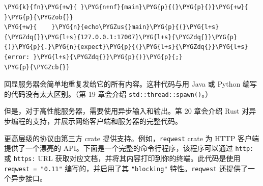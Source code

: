 \begin{Verbatim}[commandchars=\\\{\},breaklines=true,breakanywhere=true,fontsize=\codefont,xleftmargin=17bp]
\PYG{k}{fn}\PYG{+w}{ }\PYG{n+nf}{main}\PYG{p}{(}\PYG{p}{)}\PYG{+w}{ }\PYG{p}{\PYGZob{}}
\PYG{+w}{    }\PYG{n}{echo\PYGZus{}main}\PYG{p}{(}\PYG{l+s}{\PYGZdq{}}\PYG{l+s}{127.0.0.1:17007}\PYG{l+s}{\PYGZdq{}}\PYG{p}{)}\PYG{p}{.}\PYG{n}{expect}\PYG{p}{(}\PYG{l+s}{\PYGZdq{}}\PYG{l+s}{error: }\PYG{l+s}{\PYGZdq{}}\PYG{p}{)}\PYG{p}{;}
\PYG{p}{\PYGZcb{}}
\end{Verbatim}

回显服务器会简单地重复发给它的所有内容。这种代码与用 Java 或 Python 编写的代码没有太大区别。（第 19 章会介绍 \texttt{std::thread::spawn()}。）

但是，对于高性能服务器，需要使用异步输入和输出。第 20 章会介绍 Rust 对异步编程的支持，并展示网络客户端和服务器的完整代码。

更高层级的协议由第三方 crate 提供支持。例如，\texttt{reqwest} crate 为 HTTP 客户端提供了一个漂亮的 API。下面是一个完整的命令行程序，该程序可以通过 \texttt{http:} 或 \texttt{https:} URL 获取对应文档，并将其内容打印到你的终端。此代码是使用 \texttt{reqwest = "0.11"} 编写的，并启用了其 \texttt{"blocking"} 特性。\texttt{reqwest} 还提供了一个异步接口。

